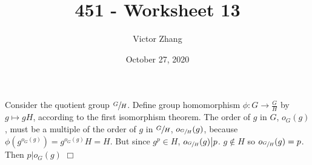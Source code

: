 \documentclass{article}
\title{451 - Worksheet 13}
\author{Victor Zhang}
\date{October 27, 2020}
\begin{document}
\maketitle

\section{}
Consider the quotient group $\sfrac{G}{H}$. Define group homomorphism $\phi: G \rightarrow \frac{G}{H}$ by $g \mapsto gH$, according to the first isomorphism theorem. The order of $g$ in $G$, $o_G(g)$, must be a multiple of the order of $g$ in $\sfrac{G}{H}$, $o_{\sfrac{G}{H}}(g)$, because $\phi(g^{o_G(g)}) = g^{o_G(g)}H = H$. But since $g^p \in H$, $o_{\sfrac{G}{H}}(g) \big\vert p$. $g \notin H$ so $o_{\sfrac{G}{H}}(g) = p$. Then $p \big\vert o_G(g)$ $\Box$
\end{document}

